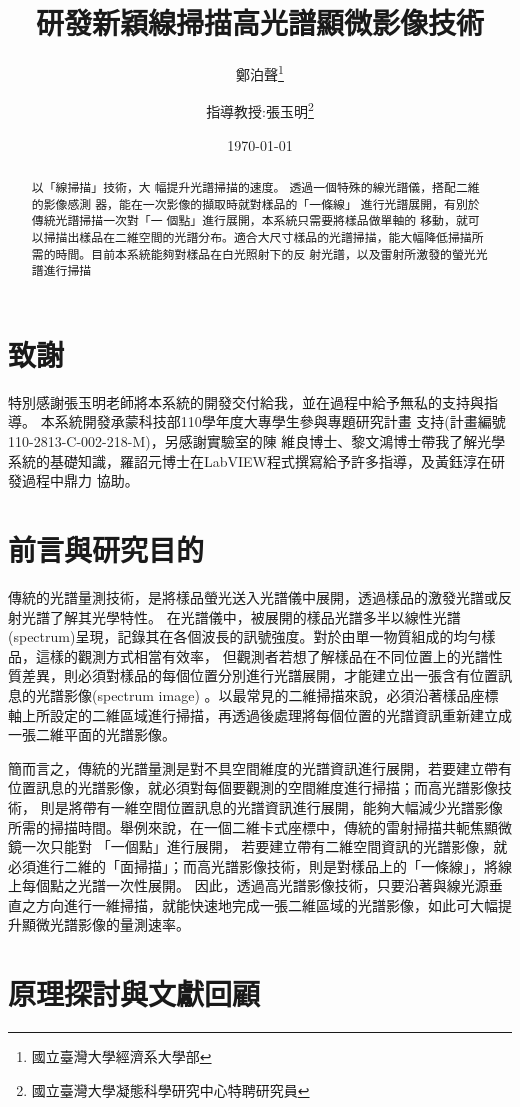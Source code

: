 \documentclass[12pt]{article}
\title{研發新穎線掃描高光譜顯微影像技術}
\author{鄭泊聲\thanks{國立臺灣大學經濟系大學部}
\and 指導教授:張玉明\thanks{國立臺灣大學凝態科學研究中心特聘研究員}}
\date{\today}
\begin{document}
    \maketitle
    \begin{abstract}
        以「線掃描」技術，大
幅提升光譜掃描的速度。
透過一個特殊的線光譜儀，搭配二維的影像感測
器，能在一次影像的擷取時就對樣品的「一條線」
進行光譜展開，有別於傳統光譜掃描一次對「一
個點」進行展開，本系統只需要將樣品做單軸的
移動，就可以掃描出樣品在二維空間的光譜分布。適合大尺寸樣品的光譜掃描，能大幅降低掃描所需的時間。目前本系統能夠對樣品在白光照射下的反
射光譜，以及雷射所激發的螢光光譜進行掃描
    \end{abstract}
    \section*{致謝}
    特別感謝張玉明老師將本系統的開發交付給我，並在過程中給予無私的支持與指導。
    本系統開發承蒙科技部110學年度大專學生參與專題研究計畫
支持(計畫編號110-2813-C-002-218-M)，另感謝實驗室的陳
維良博士、黎文鴻博士帶我了解光學系統的基礎知識，羅詔元博士在LabVIEW程式撰寫給予許多指導，及黃鈺淳在研發過程中鼎力
協助。
\tableofcontents
\listoffigures
\listoftables
    \section{前言與研究目的}
    傳統的光譜量測技術，是將樣品螢光送入光譜儀中展開，透過樣品的激發光譜或反射光譜了解其光學特性。
在光譜儀中，被展開的樣品光譜多半以線性光譜(spectrum)呈現，記錄其在各個波長的訊號強度。對於由單一物質組成的均勻樣品，這樣的觀測方式相當有效率，
但觀測者若想了解樣品在不同位置上的光譜性質差異，則必須對樣品的每個位置分別進行光譜展開，才能建立出一張含有位置訊息的光譜影像(spectrum image)
。以最常見的二維掃描來說，必須沿著樣品座標軸上所設定的二維區域進行掃描，再透過後處理將每個位置的光譜資訊重新建立成一張二維平面的光譜影像。

簡而言之，傳統的光譜量測是對不具空間維度的光譜資訊進行展開，若要建立帶有位置訊息的光譜影像，就必須對每個要觀測的空間維度進行掃描；而高光譜影像技術，
則是將帶有一維空間位置訊息的光譜資訊進行展開，能夠大幅減少光譜影像所需的掃描時間。舉例來說，在一個二維卡式座標中，傳統的雷射掃描共軛焦顯微鏡一次只能對
「一個點」進行展開，
若要建立帶有二維空間資訊的光譜影像，就必須進行二維的「面掃描」；而高光譜影像技術，則是對樣品上的「一條線」，將線上每個點之光譜一次性展開。
因此，透過高光譜影像技術，只要沿著與線光源垂直之方向進行一維掃描，就能快速地完成一張二維區域的光譜影像，如此可大幅提升顯微光譜影像的量測速率。
    \section{原理探討與文獻回顧}
\end{document}
